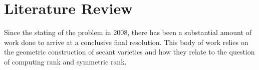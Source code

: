 \documentclass[12pt,a4paper,oneside]{book}
\def\proj{\mathbb{P}} %
\def\field{\mathbb{F}} %
\theoremstyle{definition}
\newtheorem{definition}{Definition}[section]
\begin{document}



\chapter{Literature Review}\label{chapter:litreview}
Since the stating of the problem in 2008, there has been a substantial amount of work done to arrive at a conclusive final resolution. This body of work relies on the geometric construction of secant varieties and how they relate to the question of computing rank and symmetric rank.
\end{document}

